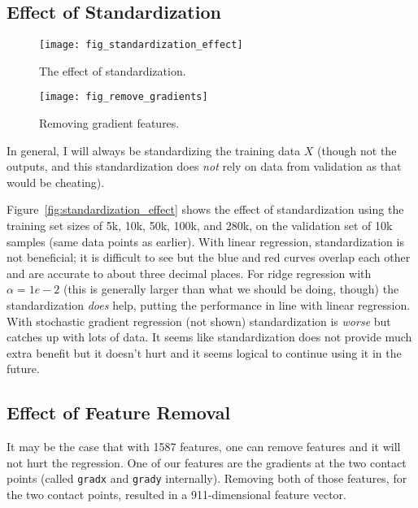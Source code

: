 \documentclass[a4paper, 11pt]{article}
\begin{document}
\subsection{Effect of Standardization}

\begin{figure}[t]
  \centering
  \begin{minipage}{.48\textwidth}
    \centering
    \texttt{[image: fig\_standardization\_effect]}
    \caption{The effect of standardization.}
    \label{fig:standardization_effect}
  \end{minipage}\hfill
    \begin{minipage}{.48\textwidth}
    \centering
    \texttt{[image: fig\_remove\_gradients]}
    \caption{Removing gradient features.}
    \label{fig:remove_gradients}
  \end{minipage}
\end{figure}

In general, I will always be standardizing the training data $X$ (though not the outputs, and this
standardization does \emph{not} rely on data from validation as that would be cheating).

Figure~\ref{fig:standardization_effect} shows the effect of standardization using the training set
sizes of 5k, 10k, 50k, 100k, and 280k, on the validation set of 10k samples (same data points as
earlier). With linear regression, standardization is not beneficial; it is difficult to see but the
blue and red curves overlap each other and are accurate to about three decimal places. For ridge
regression with $\alpha = 1e-2$ (this is generally larger than what we should be doing, though) the
standardization \emph{does} help, putting the performance in line with linear regression. With
stochastic gradient regression (not shown) standardization is \emph{worse} but catches up with lots
of data. It seems like standardization does not provide much extra benefit but it doesn't hurt and
it seems logical to continue using it in the future.

\subsection{Effect of Feature Removal}

It may be the case that with 1587 features, one can remove features and it will not hurt the
regression. One of our features are the gradients at the two contact points (called \texttt{gradx}
and \texttt{grady} internally). Removing both of those features, for the two contact points,
resulted in a 911-dimensional feature vector.
\end{document}
